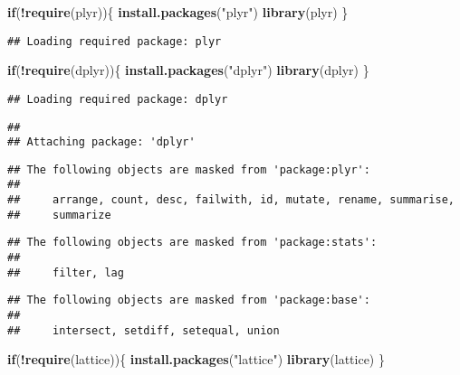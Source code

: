 \documentclass[]{article}
\newenvironment{Shaded}{\begin{snugshade}}{\end{snugshade}}
\newcommand{\KeywordTok}[1]{\textcolor[rgb]{0.13,0.29,0.53}{\textbf{#1}}}
\newcommand{\StringTok}[1]{\textcolor[rgb]{0.31,0.60,0.02}{#1}}
\newcommand{\ControlFlowTok}[1]{\textcolor[rgb]{0.13,0.29,0.53}{\textbf{#1}}}
\newcommand{\OperatorTok}[1]{\textcolor[rgb]{0.81,0.36,0.00}{\textbf{#1}}}
\newcommand{\NormalTok}[1]{#1}
\begin{document}
\begin{Shaded}
\begin{Highlighting}[]
\ControlFlowTok{if}\NormalTok{(}\OperatorTok{!}\KeywordTok{require}\NormalTok{(plyr))\{}
  \KeywordTok{install.packages}\NormalTok{(}\StringTok{"plyr"}\NormalTok{)}
  \KeywordTok{library}\NormalTok{(plyr)}
\NormalTok{\}}
\end{Highlighting}
\end{Shaded}

\begin{verbatim}
## Loading required package: plyr
\end{verbatim}

\begin{Shaded}
\begin{Highlighting}[]
\ControlFlowTok{if}\NormalTok{(}\OperatorTok{!}\KeywordTok{require}\NormalTok{(dplyr))\{}
  \KeywordTok{install.packages}\NormalTok{(}\StringTok{"dplyr"}\NormalTok{)}
  \KeywordTok{library}\NormalTok{(dplyr)}
\NormalTok{\}}
\end{Highlighting}
\end{Shaded}

\begin{verbatim}
## Loading required package: dplyr
\end{verbatim}

\begin{verbatim}
## 
## Attaching package: 'dplyr'
\end{verbatim}

\begin{verbatim}
## The following objects are masked from 'package:plyr':
## 
##     arrange, count, desc, failwith, id, mutate, rename, summarise,
##     summarize
\end{verbatim}

\begin{verbatim}
## The following objects are masked from 'package:stats':
## 
##     filter, lag
\end{verbatim}

\begin{verbatim}
## The following objects are masked from 'package:base':
## 
##     intersect, setdiff, setequal, union
\end{verbatim}

\begin{Shaded}
\begin{Highlighting}[]
\ControlFlowTok{if}\NormalTok{(}\OperatorTok{!}\KeywordTok{require}\NormalTok{(lattice))\{}
  \KeywordTok{install.packages}\NormalTok{(}\StringTok{"lattice"}\NormalTok{)}
  \KeywordTok{library}\NormalTok{(lattice)}
\NormalTok{\}}
\end{Highlighting}
\end{Shaded}
\end{document}
